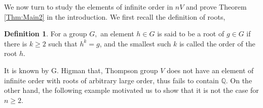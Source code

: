 \documentclass[12pt,reqno]{amsart}
\theoremstyle{plain}
\theoremstyle{definition}
\newtheorem{definition}{Definition}[section]
\theoremstyle{remark}
\newtheorem{remark}{Remark}[section]
\numberwithin{equation}{section}
\begin{document}
We now turn to study the elements of infinite order in  $nV$  
and prove Theorem \ref{Thm:Main2}  in the introduction.
%
We first recall the definition of roots,   

\begin{definition}
        For a group $G,$ 
        an element $h \in G$ is said to be a root of $g \in G$ 
        if there is  $k \geq 2$  such that $h^k = g$,  
        and the smallest such $k$  is called the order of the root $h$. 
\end{definition} 



It is known by G. Higman  \cite{Higman}  that, 
Thompson group  $V$  does not have an element of infinite order 
with roots of arbitrary large order, 
thus fails to contain  $\mathbb{Q}$.
On the other hand, 
the following example motivated us to show that 
it is not the case for  $n \geq 2$. 
\end{document}
